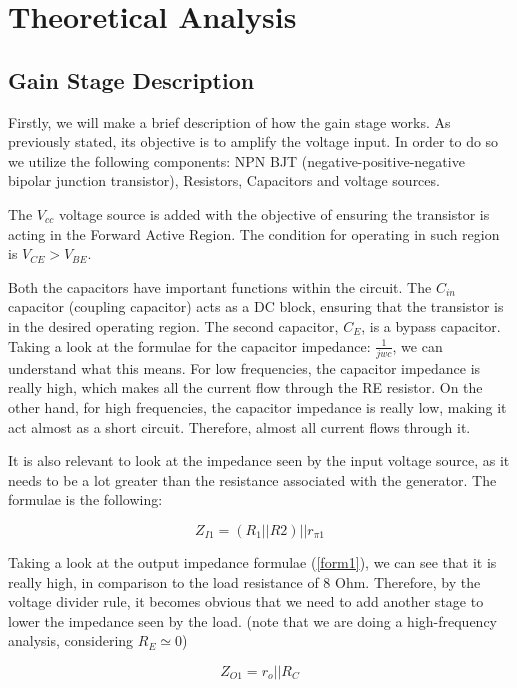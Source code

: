 \section{Theoretical Analysis}
\label{Teorica}
\subsection{Gain Stage Description}

Firstly, we will make a brief description of how the gain stage works. As previously stated, its objective is to amplify the voltage input. In order to do so we utilize the following components: NPN BJT (negative-positive-negative bipolar junction transistor), Resistors, Capacitors and voltage sources.

The $V_{cc}$ voltage source is added with the objective of ensuring the transistor is acting in the Forward Active Region. The condition for operating in such region is $V_{CE}>V_{BE}$.

Both the capacitors have important functions within the circuit. The $C_{in}$ capacitor (coupling capacitor) acts as a DC block, ensuring that the transistor is in the desired operating region. The second capacitor, $C_E$, is a bypass capacitor. Taking a look at the formulae for the capacitor impedance: $\frac{1}{jwc}$, we can understand what this means. For low frequencies, the capacitor impedance is really high, which makes all the current flow through the RE resistor. On the other hand, for high frequencies, the capacitor impedance is really low, making it act almost as a short circuit. Therefore, almost all current flows through it.

It is also relevant to look at the impedance seen by the input voltage source, as it needs to be a lot greater than the resistance associated with the generator. The formulae is the following:

\begin{equation}
    Z_{I1}= (R_1 || R2) || r_{\pi 1}
\end{equation}


Taking a look at the output impedance formulae (\ref{form1}), we can see that it is really high, in comparison to the load resistance of 8 Ohm. Therefore, by the voltage divider rule, it becomes obvious that we need to add another stage to lower the impedance seen by the load. (note that we are doing a high-frequency analysis, considering $R_E \simeq 0$)

\begin{equation}
\label{form1}
     Z_{O1}=r_o || R_C
\end{equation}

